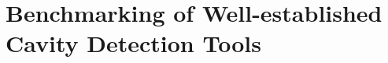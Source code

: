 \documentclass[Ingles]{phdthesis}
\begin{document}

\section{Benchmarking of Well-established Cavity Detection Tools}





\end{document}
